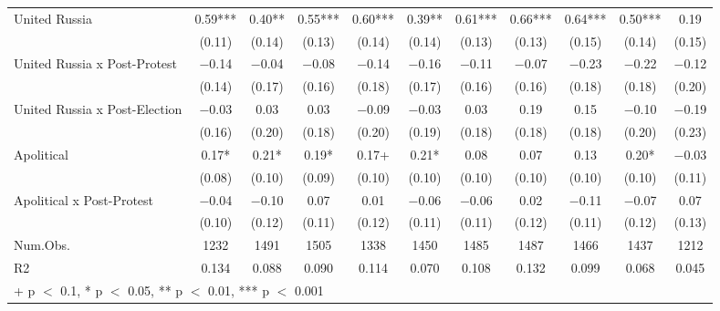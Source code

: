 \documentclass[
  letterpaper,
  DIV=11,
  numbers=noendperiod]{scrartcl}
\begin{document}
\begin{table}[!h]
{\begin{tabular}[t]{lcccccccccc}
United Russia & \num{0.59}*** & \num{0.40}** & \num{0.55}*** & \num{0.60}*** & \num{0.39}** & \num{0.61}*** & \num{0.66}*** & \num{0.64}*** & \num{0.50}*** & \num{0.19}\\
 & (\num{0.11}) & (\num{0.14}) & (\num{0.13}) & (\num{0.14}) & (\num{0.14}) & (\num{0.13}) & (\num{0.13}) & (\num{0.15}) & (\num{0.14}) & (\num{0.15})\\
United Russia x Post-Protest & \num{-0.14} & \num{-0.04} & \num{-0.08} & \num{-0.14} & \num{-0.16} & \num{-0.11} & \num{-0.07} & \num{-0.23} & \num{-0.22} & \num{-0.12}\\
 & (\num{0.14}) & (\num{0.17}) & (\num{0.16}) & (\num{0.18}) & (\num{0.17}) & (\num{0.16}) & (\num{0.16}) & (\num{0.18}) & (\num{0.18}) & (\num{0.20})\\
United Russia x Post-Election & \num{-0.03} & \num{0.03} & \num{0.03} & \num{-0.09} & \num{-0.03} & \num{0.03} & \num{0.19} & \num{0.15} & \num{-0.10} & \num{-0.19}\\
 & (\num{0.16}) & (\num{0.20}) & (\num{0.18}) & (\num{0.20}) & (\num{0.19}) & (\num{0.18}) & (\num{0.18}) & (\num{0.18}) & (\num{0.20}) & (\num{0.23})\\
Apolitical & \num{0.17}* & \num{0.21}* & \num{0.19}* & \num{0.17}+ & \num{0.21}* & \num{0.08} & \num{0.07} & \num{0.13} & \num{0.20}* & \num{-0.03}\\
 & (\num{0.08}) & (\num{0.10}) & (\num{0.09}) & (\num{0.10}) & (\num{0.10}) & (\num{0.10}) & (\num{0.10}) & (\num{0.10}) & (\num{0.10}) & (\num{0.11})\\
Apolitical x Post-Protest & \num{-0.04} & \num{-0.10} & \num{0.07} & \num{0.01} & \num{-0.06} & \num{-0.06} & \num{0.02} & \num{-0.11} & \num{-0.07} & \num{0.07}\\
 & (\num{0.10}) & (\num{0.12}) & (\num{0.11}) & (\num{0.12}) & (\num{0.11}) & (\num{0.11}) & (\num{0.12}) & (\num{0.11}) & (\num{0.12}) & (\num{0.13})\\
\midrule
Num.Obs. & \num{1232} & \num{1491} & \num{1505} & \num{1338} & \num{1450} & \num{1485} & \num{1487} & \num{1466} & \num{1437} & \num{1212}\\
R2 & \num{0.134} & \num{0.088} & \num{0.090} & \num{0.114} & \num{0.070} & \num{0.108} & \num{0.132} & \num{0.099} & \num{0.068} & \num{0.045}\\
\bottomrule
\multicolumn{11}{l}{\rule{0pt}{1em}+ p $<$ 0.1, * p $<$ 0.05, ** p $<$ 0.01, *** p $<$ 0.001}\\
\end{tabular}}
\end{table}
\end{document}
